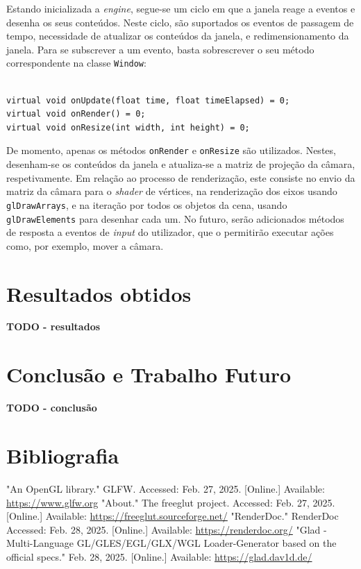 \documentclass[12pt, a4paper]{article}
\begin{document}
Estando inicializada a \emph{engine}, segue-se um ciclo em que a janela reage a eventos e desenha os
seus conteúdos. Neste ciclo, são suportados os eventos de passagem de tempo, necessidade de
atualizar os conteúdos da janela, e redimensionamento da janela. Para se subscrever a um evento,
basta sobrescrever o seu método correspondente na classe \texttt{Window}:

\begin{lstlisting}

virtual void onUpdate(float time, float timeElapsed) = 0;
virtual void onRender() = 0;
virtual void onResize(int width, int height) = 0;
\end{lstlisting}

De momento, apenas os métodos \texttt{onRender} e \texttt{onResize} são utilizados. Nestes,
desenham-se os conteúdos da janela e atualiza-se a matriz de projeção da câmara, respetivamente. Em
relação ao processo de renderização, este consiste no envio da matriz da câmara para o \emph{shader}
de vértices, na renderização dos eixos usando \texttt{glDrawArrays}, e na iteração por todos os
objetos da cena, usando \texttt{glDrawElements} para desenhar cada um. No futuro, serão adicionados
métodos de resposta a eventos de \emph{input} do utilizador, que o permitirão executar ações como,
por exemplo, mover a câmara.

\section{Resultados obtidos}

\textbf{\color{red} TODO - resultados}

\section{Conclusão e Trabalho Futuro}

\textbf{\color{red} TODO - conclusão}

\begingroup
\section{Bibliografia}
\renewcommand{\section}[2]{}

\begin{thebibliography}{9}
        "An OpenGL library."{} GLFW. Accessed: Feb. 27, 2025. [Online.] Available:
        \url{https://www.glfw.org}
        "About."{} The freeglut project. Accessed: Feb. 27, 2025. [Online.] Available:
        \url{https://freeglut.sourceforge.net/}
        "RenderDoc."{} RenderDoc Accessed: Feb. 28, 2025. [Online.] Available:
        \url{https://renderdoc.org/}
        "Glad - Multi-Language GL/GLES/EGL/GLX/WGL Loader-Generator based on the official specs."{}
        Feb. 28, 2025. [Online.] Available: \url{https://glad.dav1d.de/}
\end{thebibliography}
\endgroup
\end{document}
